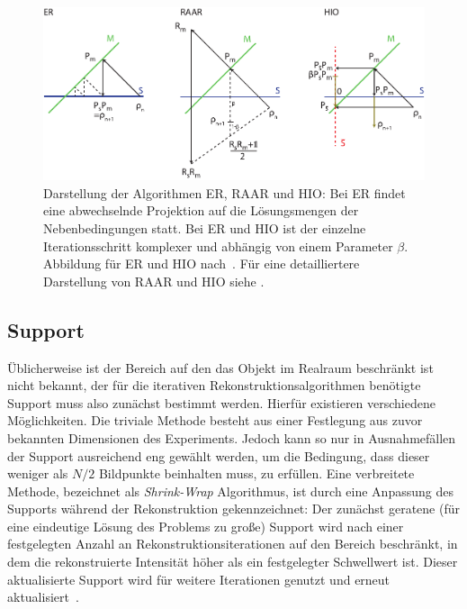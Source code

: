 \begin{figure}
	\centering
	\includegraphics[width=1\textwidth]{images/algorithmen.pdf}
	\caption[Rekonstruktionsalgorithmen]{Darstellung der Algorithmen ER, RAAR und HIO: Bei ER findet eine abwechselnde Projektion auf die Lösungsmengen der Nebenbedingungen statt. Bei ER und HIO ist der einzelne Iterationsschritt komplexer und abhängig von einem Parameter $\beta$. Abbildung für ER und HIO nach~\cite{marchesini2007}. Für eine detailliertere Darstellung von RAAR und HIO siehe .}
	\label{fig:recon}
\end{figure} 
\subsection{Support}
Üblicherweise ist der Bereich auf den das Objekt im Realraum beschränkt ist nicht bekannt, der für die iterativen Rekonstruktionsalgorithmen benötigte Support muss also zunächst bestimmt werden. Hierfür existieren verschiedene Möglichkeiten. Die triviale Methode besteht aus einer Festlegung aus zuvor bekannten Dimensionen des Experiments. Jedoch kann so nur in Ausnahmefällen der Support ausreichend eng gewählt werden, um die Bedingung, dass dieser weniger als $N/2$ Bildpunkte beinhalten muss, zu erfüllen.
Eine verbreitete Methode, bezeichnet als \textit{Shrink-Wrap} Algorithmus, ist durch eine Anpassung des Supports während der Rekonstruktion gekennzeichnet: Der zunächst geratene (für eine eindeutige Lösung des Problems  zu große) Support wird nach einer festgelegten Anzahl an Rekonstruktionsiterationen auf den Bereich beschränkt, in dem die rekonstruierte Intensität höher als ein festgelegter Schwellwert ist. Dieser aktualisierte Support wird für weitere Iterationen genutzt und erneut aktualisiert~\cite{marchesini2003}.

